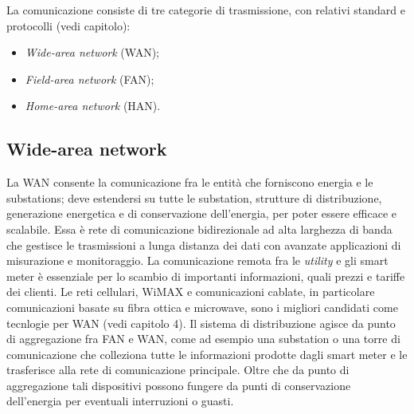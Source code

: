 
La comunicazione consiste di tre categorie di trasmissione, con relativi standard e protocolli (vedi capitolo):
\begin{itemize}
	\item \emph{Wide-area network} (WAN);
	\item \emph{Field-area network} (FAN);
	\item \emph{Home-area network} (HAN).
\end{itemize}


\subsection{Wide-area network}
La WAN consente la comunicazione fra le entità che forniscono energia e le substations; deve estendersi su tutte le substation, strutture di distribuzione, generazione energetica e di conservazione dell'energia, per poter essere efficace e scalabile. Essa è rete di comunicazione bidirezionale ad alta larghezza di banda che gestisce le trasmissioni a lunga distanza dei dati con avanzate applicazioni di misurazione e monitoraggio. La comunicazione remota fra le \emph{utility} e gli smart meter è essenziale per lo scambio di importanti informazioni, quali prezzi e tariffe dei clienti. Le reti cellulari, WiMAX e comunicazioni cablate, in particolare comunicazioni basate su fibra ottica e microwave, sono i migliori candidati come tecnlogie per WAN (vedi capitolo 4).
\newline
Il sistema di distribuzione agisce da punto di aggregazione fra FAN e WAN, come ad esempio una substation o una torre di comunicazione che colleziona tutte le informazioni prodotte dagli smart meter e le trasferisce alla rete di comunicazione principale. Oltre che da punto di aggregazione tali dispositivi possono fungere da punti di conservazione dell'energia per eventuali interruzioni o guasti.

